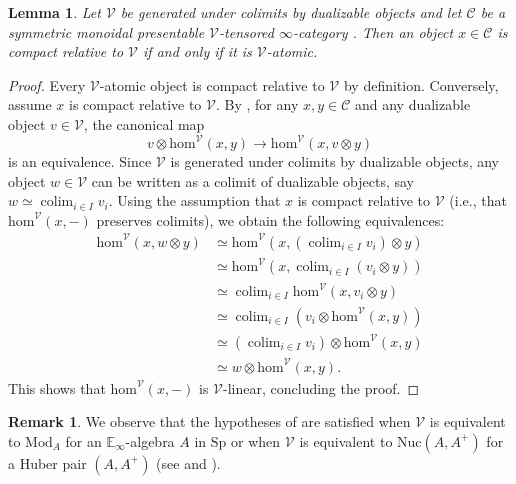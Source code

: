 \documentclass[oneside, hidelinks, 12pt, a4paper,reqno]{amsart}
\theoremstyle{plain}
\theoremstyle{definition}
\newtheorem{remark}[remark]{Remark}
\theoremstyle{plain}
\newtheorem{lemma}[lemma]{Lemma}
\newcommand{\cC}{\mathscr C}
\newcommand{\cV}{\mathscr V}
\newcommand{\bbE}{\mathbb E}
\newcommand{\cat}{$\infty$-category }
\newcommand{\Nuc}{\mathrm{Nuc}}
\newcommand{\Mod}{\mathrm{Mod}}
\DeclareMathOperator*{\colim}{colim}
\begin{document}
\begin{lemma}\label{lem: atomic vs relatively compact}
    Let $\cV$ be generated under colimits by dualizable objects and let $\cC$ be a symmetric monoidal presentable $\cV$-tensored \cat. Then an object $x \in \cC$ is compact relative to $\cV$ if and only if it is $\cV$-atomic.
\end{lemma}
\begin{proof}
    Every $\cV$-atomic object is compact relative to $\cV$ by definition. Conversely, assume $x$ is compact relative to $\cV$. By \cite[Corollary 3.8]{ramzi2024locallyrigidinftycategories}, for any $x, y \in \cC$ and any dualizable object $v \in \cV$, the canonical map
    \[
    v\otimes\mathrm{hom}^{\cV}(x,y) \to \mathrm{hom}^{\cV}(x,v\otimes y)
    \]
    is an equivalence. Since $\cV$ is generated under colimits by dualizable objects, any object $w \in \cV$ can be written as a colimit of dualizable objects, say $w \simeq \colim_{i \in I} v_{i}$. Using the assumption that $x$ is compact relative to $\cV$ (i.e., that $\mathrm{hom}^{\cV}(x,-)$ preserves colimits), we obtain the following equivalences:
    \begin{align*}
        \mathrm{hom}^{\cV}(x,w \otimes y) & \simeq \mathrm{hom}^{\cV}(x, (\colim_{i \in I} v_{i}) \otimes y) \\
        & \simeq \mathrm{hom}^{\cV}(x, \colim_{i \in I} (v_{i} \otimes y)) \\
        & \simeq \colim_{i \in I} \mathrm{hom}^{\cV}(x, v_{i} \otimes y) \\
        & \simeq \colim_{i \in I} (v_{i} \otimes \mathrm{hom}^{\cV}(x,y)) \\
        & \simeq (\colim_{i \in I} v_{i}) \otimes \mathrm{hom}^{\cV}(x,y) \\
        & \simeq w \otimes \mathrm{hom}^{\cV}(x,y).
    \end{align*}
    This shows that $\mathrm{hom}^{\cV}(x,-)$ is $\cV$-linear, concluding the proof.
\end{proof}

\begin{remark}
    We observe that the hypotheses of  are satisfied when $\cV$ is equivalent to $\Mod_{A}$ for an $\bbE_{\infty}$-algebra $A$ in $\mathrm{Sp}$ or when $\cV$ is equivalent to $\Nuc(A,A^{+})$ for a Huber pair $(A,A^{+})$ (see \cite[Satz 3.16]{andreychev2023ktheorieadischerraume} and \cite[Proposition 5.35]{andreychev2021pseudocoherent}).
\end{remark}
\end{document}

